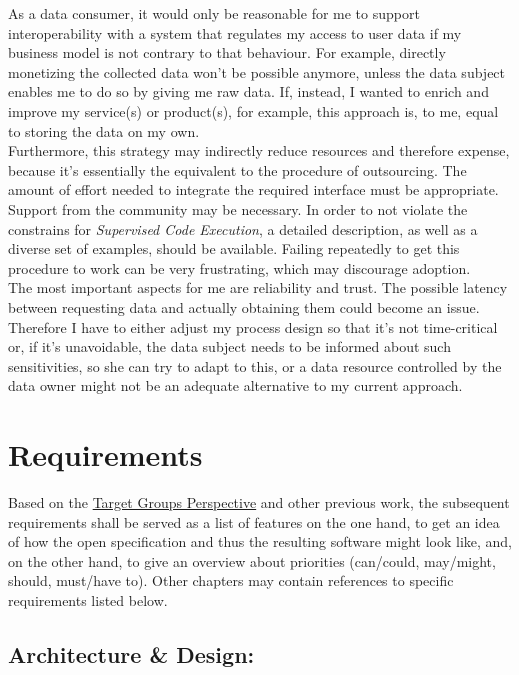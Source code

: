 \documentclass[12pt,english,a4paper,titlepage,cleardoublepage=empty,dottedtoc]{report}
\begin{document}
As a data consumer, it would only be reasonable for me to support
interoperability with a system that regulates my access to user data if
my business model is not contrary to that behaviour. For example,
directly monetizing the collected data won't be possible anymore, unless
the data subject enables me to do so by giving me raw data. If, instead,
I wanted to enrich and improve my service(s) or product(s), for example,
this approach is, to me, equal to storing the data on my own.\\
Furthermore, this strategy may indirectly reduce resources and therefore
expense, because it's essentially the equivalent to the procedure of
outsourcing. The amount of effort needed to integrate the required
interface must be appropriate. Support from the community may be
necessary. In order to not violate the constrains for \emph{Supervised
Code Execution}, a detailed description, as well as a diverse set of
examples, should be available. Failing repeatedly to get this procedure
to work can be very frustrating, which may discourage adoption.\\
The most important aspects for me are reliability and trust. The
possible latency between requesting data and actually obtaining them
could become an issue. Therefore I have to either adjust my process
design so that it's not time-critical or, if it's unavoidable, the data
subject needs to be informed about such sensitivities, so she can try to
adapt to this, or a data resource controlled by the data owner might not
be an adequate alternative to my current approach.

\hypertarget{requirements}{\section{Requirements}\label{requirements}}

Based on the \protect\hyperlink{target-groups-perspective}{Target Groups
Perspective} and other previous work, the subsequent requirements shall
be served as a list of features on the one hand, to get an idea of how
the open specification and thus the resulting software might look like,
and, on the other hand, to give an overview about priorities (can/could,
may/might, should, must/have to). Other chapters may contain references
to specific requirements listed below.

\subsection*{Architecture \& Design:}\label{architecture-design}
\end{document}
